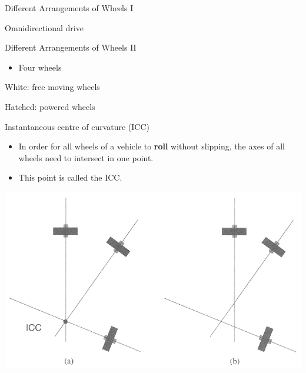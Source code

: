 \documentclass[compress]{beamer}
\begin{document}
\begin{frame}{Different Arrangements of Wheels I}

Omnidirectional drive


\end{frame}

\begin{frame}{Different Arrangements of Wheels II}

\begin{itemize}
    \item Four wheels
\end{itemize}

White: free moving wheels

Hatched: powered wheels

\end{frame}

\begin{frame}{Instantaneous centre of curvature (ICC)}

\begin{itemize}
    \item In order for all wheels of a vehicle to \textbf{roll} without
  slipping, the axes of all wheels need to intersect in one point.
    \item This point is called the ICC.
\end{itemize}

    \begin{center}
        \includegraphics[width=0.8\linewidth]{icc}
    \end{center}
\end{frame}
\end{document}
